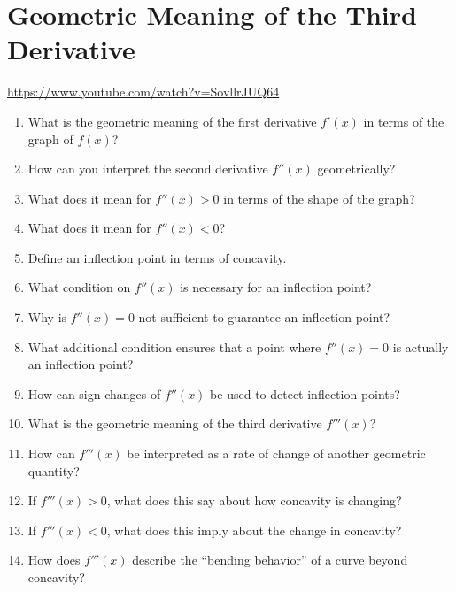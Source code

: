 \section{Geometric Meaning of the Third Derivative}

\url{https://www.youtube.com/watch?v=SovllrJUQ64}

\begin{enumerate}

\item What is the geometric meaning of the first derivative $f'(x)$ in terms of the graph of $f(x)$?

\item How can you interpret the second derivative $f''(x)$ geometrically?

\item What does it mean for $f''(x) > 0$ in terms of the shape of the graph?

\item What does it mean for $f''(x) < 0$?

\item Define an inflection point in terms of concavity.

\item What condition on $f''(x)$ is necessary for an inflection point?

\item Why is $f''(x)=0$ not sufficient to guarantee an inflection point?

\item What additional condition ensures that a point where $f''(x)=0$ is actually an inflection point?

\item How can sign changes of $f''(x)$ be used to detect inflection points?

\item What is the geometric meaning of the third derivative $f'''(x)$?

\item How can $f'''(x)$ be interpreted as a rate of change of another geometric quantity?

\item If $f'''(x) > 0$, what does this say about how concavity is changing?

\item If $f'''(x) < 0$, what does this imply about the change in concavity?

\item How does $f'''(x)$ describe the “bending behavior” of a curve beyond concavity?


\end{enumerate}
